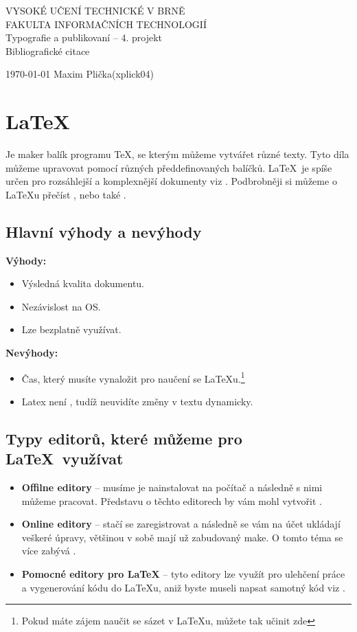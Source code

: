 \documentclass[a4paper,12pt]{article}
\begin{document}
\begin{titlepage}
\begin{center}
\huge
\textsc{VYSOKÉ UČENÍ TECHNICKÉ V BRNĚ\\
FAKULTA INFORMAČNÍCH TECHNOLOGIÍ
}
\\
\large
Typografie a publikovaní – 4. projekt\\
\LARGE
Bibliografické citace 
\end{center}
{\large \today \hfill
Maxim Plička(xplick04)}
\end{titlepage}

\section{\LaTeX}
Je maker balík programu \TeX, se kterým můžeme vytvářet různé texty. Tyto díla můžeme upravovat pomocí různých předdefinovaných balíčků. \LaTeX~je spíše určen pro rozsáhlejší a komplexnější dokumenty viz \cite{pavelka}. Podbrobněji si můžeme o \LaTeX u přečíst \cite{Simecek}, nebo také \cite{Davidek}.

\subsection{Hlavní výhody a nevýhody}
\textbf{Výhody:}
\begin{itemize}
    \item Výsledná kvalita dokumentu.
    \item Nezávislost na OS.
    \item Lze bezplatně využívat.
\end{itemize}
\textbf{Nevýhody:}
\begin{itemize}
    \item Čas, který musíte vynaložit pro naučení se \LaTeX u.\footnote{Pokud máte zájem naučit se sázet v \LaTeX u, můžete tak učinit zde\cite{Rybicka}}
    \item Latex není , tudíž neuvidíte změny v textu dynamicky.
\end{itemize}


\subsection{Typy editorů, které můžeme pro \LaTeX~využívat}
\begin{itemize}
    \item \textbf{Offilne editory} -- musíme je nainstalovat na počítač a následně s nimi můžeme pracovat. Představu o těchto editorech by vám mohl vytvořit \cite{Stastny}.
    \item \textbf{Online editory} -- stačí se zaregistrovat a následně se vám na účet ukládají veškeré úpravy, většinou v sobě mají už zabudovaný make. O tomto téma se více zabývá \cite{Sokol}.
    \item \textbf{Pomocné editory pro \LaTeX} -- tyto editory lze využít pro ulehčení práce a vygenerování kódu do \LaTeX u, aniž byste museli napsat samotný kód viz \cite{oksuzozcan}.
\end{itemize}
\end{document}
